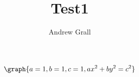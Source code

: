 \documentclass{ximera}
\title{Test1}
\author{Andrew Grall}
\begin{document}
\maketitle

\[
\graph{a=1,b=1,c=1,ax^2+by^2=c^2}
\]
\end{document}

